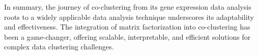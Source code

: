 


In summary, the journey of co-clustering from its gene expression data analysis roots to a widely applicable data analysis technique underscores its adaptability and effectiveness. The integration of matrix factorization into co-clustering has been a game-changer, offering scalable, interpretable, and efficient solutions for complex data clustering challenges.
